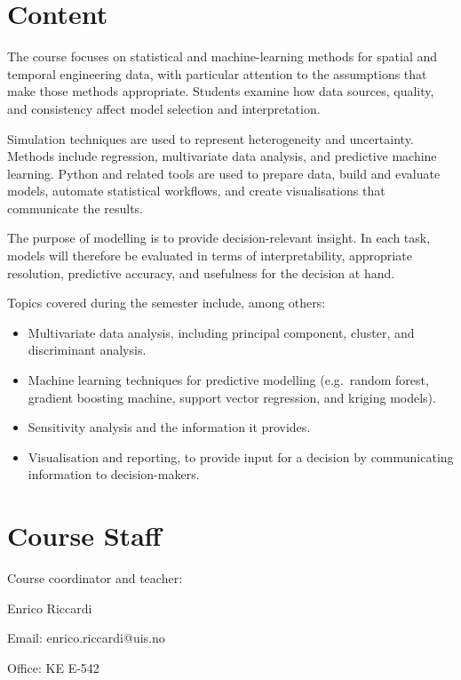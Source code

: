 \documentclass[letterpaper,12pt,oneside]{article}
\begin{document}
\section*{Content}


The course focuses on statistical and machine-learning methods for spatial and temporal engineering data, with particular attention to the assumptions that make those methods appropriate. Students examine how data sources, quality, and consistency affect model selection and interpretation.

Simulation techniques are used to represent heterogeneity and uncertainty. Methods include regression, multivariate data analysis, and predictive machine learning. Python and related tools are used to prepare data, build and evaluate models, automate statistical workflows, and create visualisations that communicate the results.

The purpose of modelling is to provide decision-relevant insight. In each task, models will therefore be evaluated in terms of interpretability, appropriate resolution, predictive accuracy, and usefulness for the decision at hand.

Topics covered during the semester include, among others:

\begin{itemize}
\item Multivariate data analysis, including principal component, cluster, and discriminant analysis.
\item Machine learning techniques for predictive modelling (e.g.\ random forest, gradient boosting machine, support vector regression, and kriging models).
\item Sensitivity analysis and the information it provides.
\item Visualisation and reporting, to provide input for a decision by communicating information to decision-makers.
\end{itemize}


\section*{Course Staff}

Course coordinator and teacher:

Enrico Riccardi

Email: enrico.riccardi@uis.no

Office: KE E-542

\vspace{1em}
\end{document}
